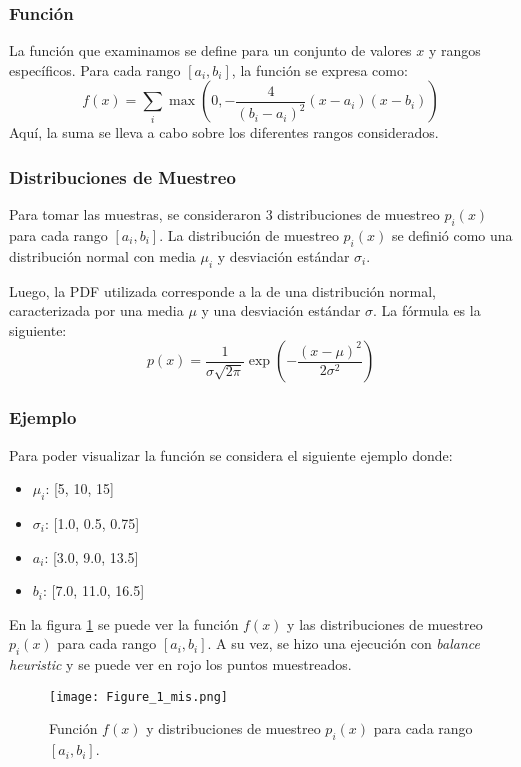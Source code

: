 \documentclass{article}
\begin{document}
\subsubsection{Función}
La función que examinamos se define para un conjunto de valores \( x \) y rangos específicos. Para cada rango \( [a_{i}, b_{i}] \), la función se expresa como:
$$
f(x) = \sum_{i} \max\left(0, -\frac{4}{(b_{i} - a_{i})^2} (x - a_{i})(x - b_{i})\right)
$$
Aquí, la suma se lleva a cabo sobre los diferentes rangos considerados.

\subsubsection{Distribuciones de Muestreo}

Para tomar las muestras, se consideraron 3 distribuciones de muestreo \( p_{i}(x) \) para cada rango \( [a_{i}, b_{i}] \).
La distribución de muestreo \( p_{i}(x) \) se definió como una distribución normal con media \( \mu_{i} \) y desviación estándar \( \sigma_{i} \).

Luego, la PDF utilizada corresponde a la de una distribución normal, caracterizada por una media \( \mu \) y una desviación estándar \( \sigma \). La fórmula es la siguiente:
$$
p(x) = \frac{1}{\sigma \sqrt{2\pi}} \exp\left(-\frac{(x - \mu)^2}{2\sigma^2}\right)
$$


\subsubsection{Ejemplo}

Para poder visualizar la función se considera el siguiente ejemplo donde:

\begin{itemize}
    \item \textbf{\( \mu_{i} \)}: [5, 10, 15]
    \item \textbf{\( \sigma_{i} \)}: [1.0, 0.5, 0.75]
    \item \textbf{\( a_{i} \)}: [3.0, 9.0, 13.5]
    \item \textbf{\( b_{i} \)}: [7.0, 11.0, 16.5]
\end{itemize}

En la figura \ref{fig:mis1} se puede ver la función \( f(x) \) y las distribuciones de muestreo \( p_{i}(x) \) para cada rango \( [a_{i}, b_{i}] \).
A su vez, se hizo una ejecución con \textit{balance heuristic} y se puede ver en rojo los puntos muestreados.

\begin{figure}[H]
\texttt{[image: Figure\_1\_mis.png]}
\caption{Función \( f(x) \) y distribuciones de muestreo \( p_{i}(x) \) para cada rango \( [a_{i}, b_{i}] \).}
\label{fig:mis1}
\end{figure}
\end{document}
